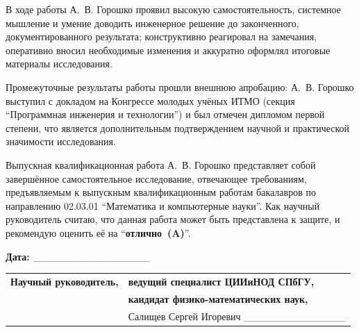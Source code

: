 \documentclass[12pt,a4paper]{article}
\begin{document}
В ходе работы А.~В. Горошко проявил высокую самостоятельность,
системное мышление и умение доводить инженерное решение до
законченного, документированного результата; конструктивно реагировал
на замечания, оперативно вносил необходимые изменения и аккуратно
оформлял итоговые материалы исследования.

Промежуточные результаты работы прошли внешнюю апробацию: А.~В. Горошко
выступил с докладом на Конгрессе молодых учёных ИТМО (секция
\enquote{Программная инженерия и технологии}) и был отмечен дипломом
первой степени, что является дополнительным подтверждением научной и
практической значимости исследования.

Выпускная квалификационная работа А.~В. Горошко представляет собой
завершённое самостоятельное исследование, отвечающее требованиям,
предъявляемым к выпускным квалификационным работам бакалавров по
направлению 02.03.01 \enquote{Математика и компьютерные науки}. Как
научный руководитель считаю, что данная работа может быть представлена
к защите, и рекомендую оценить её на \enquote{\textbf{отлично~(A)}}.

\vspace{1.2em}

\noindent\textbf{Дата:} \_\_\_\_\_\_\_\_\_\_\_\_\_\_\_\_

\vspace{2.5em}

\noindent\begin{tabular}{@{}p{5cm}p{9cm}@{}}
\textbf{Научный руководитель,} & \textbf{ведущий специалист ЦИИиНОД СПбГУ,} \\
& \textbf{кандидат физико-математических наук,} \\
& Салищев Сергей Игоревич \hfill \_\_\_\_\_\_\_\_\_\_\_\_\_\_
\end{tabular}
\end{document}
